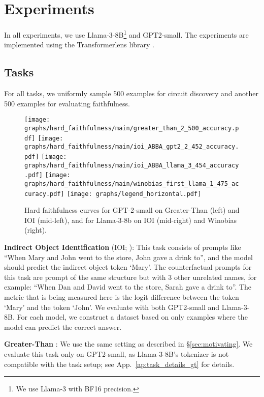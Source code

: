 \section{Experiments}
In all experiments, we use Llama-3-8B\footnote{We use Llama-3 with BF16 precision.} and GPT2-small. The experiments are implemented using the Transformerlens library \citep{nanda2022transformerlens}.

\subsection{Tasks}
For all tasks, we uniformly sample 500 examples for circuit discovery and another 500 examples for evaluating faithfulness.


\begin{figure*}[t!]
    \centering
    \texttt{[image: graphs/hard\_faithfulness/main/greater\_than\_2\_500\_accuracy.pdf]} \hfill \texttt{[image: graphs/hard\_faithfulness/main/ioi\_ABBA\_gpt2\_2\_452\_accuracy.pdf]} \hfill \texttt{[image: graphs/hard\_faithfulness/main/ioi\_ABBA\_llama\_3\_454\_accuracy.pdf]} \hfill \texttt{[image: graphs/hard\_faithfulness/main/winobias\_first\_llama\_1\_475\_accuracy.pdf]}
    \vspace{0.05cm}
     \texttt{[image: graphs/legend\_horizontal.pdf]} \hfill 
    \caption{Hard faithfulness 
    curves for GPT-2-small on Greater-Than (left) and IOI (mid-left), and for Llama-3-8b on IOI (mid-right) and Winobias (right).}
    \label{fig:faithfulness_all_main}
    \vspace{-5pt}
\end{figure*}


\textbf{Indirect Object Identification} (IOI; \citealp{wanginterpretability}): This task consists of prompts like ``When Mary and John went to the store, John gave a drink to'', and the model should predict the indirect object token `Mary'. The counterfactual prompts for this task are prompt of the same structure but with 3 other unrelated names, for example: ``When Dan and David went to the store, Sarah gave a drink to''. The metric that is being measured here is the logit difference between the token `Mary' and the token `John'. We evaluate with both GPT2-small and Llama-3-8B. For each model, we construct a dataset based on only examples where the model can predict the correct answer. 


\textbf{Greater-Than} \citep{hanna2024does}: We use the same setting as described in \S\ref{sec:motivating}. We evaluate this task only on GPT2-small, as Llama-3-8B's tokenizer is not compatible with the task setup; see App.~\ref{ap:task_details_gt} for details.

